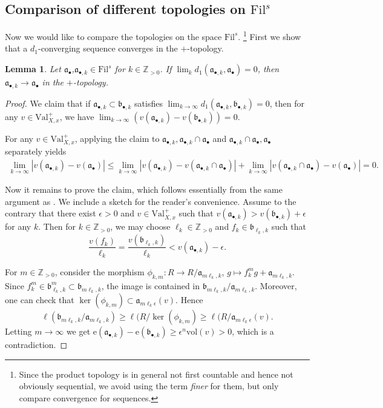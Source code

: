 \documentclass[11pt, leqno]{amsart}%
\theoremstyle{plain}
\newtheorem{lemma}[theorem]{Lemma}
\theoremstyle{definition}
\theoremstyle{remark}
\newcommand{\bZ}{\mathbb{Z}}
\newcommand{\fa}{\mathfrak{a}}
\newcommand{\fb}{\mathfrak{b}}
\newcommand{\vol}{\mathrm{vol}}
\newcommand{\Val}{\mathrm{Val}}
\newcommand{\e}{\mathrm{e}}
\newcommand{\Fil}{\mathrm{Fil}}
\numberwithin{equation}{section}
\begin{document}
	
    







\subsection{Comparison of different topologies on $\Fil^s$}\label{ssec:comparison}

Now we would like to compare the topologies on the space $\Fil^s$. \footnote{Since the product topology is in general not first countable and hence not obviously sequential, we avoid using the term \emph{finer} for them, but only compare convergence for sequences.} First we show that a $d_1$-converging sequence converges in the $+$-topology.

\begin{lemma}\label{lem:d_1 finer than +}
    Let $\fa_\bullet$,$\fa_{\bullet,k}\in\Fil^s$ for $k\in\bZ_{>0}$. If $\lim_k d_1(\fa_{\bullet,k},\fa_\bullet)=0$, then $\fa_{\bullet,k}\to \fa_\bullet$ in the $+$-topology.
\end{lemma}

\begin{proof}
    We claim that if $\fa_{\bullet,k}\subset\fb_{\bullet,k}$ satisfies $\lim_{k\to\infty}d_1(\fa_{\bullet,k},\fb_{\bullet,k})=0$, then for any $v\in\Val^+_{X,x}$, we have $\lim_{k\to\infty} (v(\fa_{\bullet,k})-v(\fb_{\bullet,k}))=0$.
	
    For any $v\in\Val^+_{X,x}$, applying the claim to $\fa_{\bullet,k},\fa_{\bullet,k}\cap\fa_\bullet$ and $\fa_{\bullet,k}\cap\fa_\bullet,\fa_\bullet$ separately yields
    \begin{align*}
        \lim_{k\to\infty} |v(\fa_{\bullet,k})-v(\fa_\bullet)|\le \lim_{k\to\infty} |v(\fa_{\bullet,k})-v(\fa_{\bullet,k}\cap\fa_\bullet)|+\lim_{k\to\infty}|v(\fa_{\bullet,k}\cap\fa_\bullet)-v(\fa_\bullet)|=0.
    \end{align*}
	
    Now it remains to prove the claim, which follows essentially from the same argument as \cite[Proposition 3.12]{BLQ22}. We include a sketch for the reader's convenience. Assume to the contrary that there exist $\epsilon>0$ and $v\in\Val^+_{X,x}$ such that $v(\fa_{\bullet,k})>v(\fb_{\bullet,k})+\epsilon$ for any $k$. Then for $k\in\bZ_{>0}$, we may choose $\ell_k\in\bZ_{>0}$ and $f_k\in\fb_{\ell_k,k}$ such that 
    \[
        \frac{v(f_k)}{\ell_k}=\frac{v(\fb_{\ell_k,k})}{\ell_k}<v(\fa_{\bullet,k})-\epsilon.
    \]
	
    For $m\in\bZ_{>0}$, consider the morphism $\phi_{k,m}:R\to R/\fa_{m\ell_k,k}$, $g\mapsto f_k^mg+\fa_{m\ell_k,k}$. Since $f_k^m\in\fb_{\ell_k,k}^m\subset\fb_{m\ell_k,k}$, the image is contained in $\fb_{m\ell_k,k}/\fa_{m\ell_k,k}$. Moreover, one can check that $\ker(\phi_{k,m})\subset \fa_{m\ell_k\epsilon}(v)$. Hence 
    \[
        \ell(\fb_{m\ell_k,k}/\fa_{m\ell_k,k})\ge \ell(R/\ker(\phi_{k,m})\ge \ell(R/\fa_{m\ell_k\epsilon}(v).
    \]
    Letting $m\to\infty$ we get $\e(\fa_{\bullet,k})-\e(\fb_{\bullet,k})\ge \epsilon^n\vol(v)>0$, which is a contradiction.
\end{proof}
\end{document}
